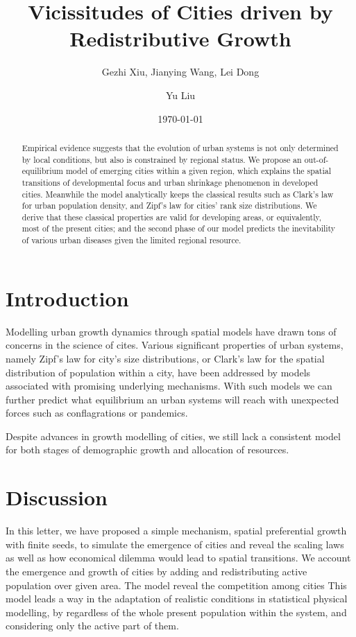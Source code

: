 \documentclass[reprint,unsortedaddress,amsmath,amssymb,aps,prl,showkeys]{revtex4-2}
\begin{document}
\title{Vicissitudes of Cities driven by Redistributive Growth}
\author{Gezhi Xiu, Jianying Wang, Lei Dong}
\author{Yu Liu}
\date{\today}

\begin{abstract}
    Empirical evidence suggests that the evolution of urban systems is not only determined by local conditions, but also is constrained by regional status. We propose an out-of-equilibrium model of emerging cities within a given region, which explains the spatial transitions of developmental focus and urban shrinkage phenomenon in developed cities. Meanwhile the model analytically keeps the classical results such as Clark's law for urban population density, and Zipf's law for cities' rank size distributions. We derive that these classical properties are valid for developing areas, or equivalently, most of the present cities; and the second phase of our model predicts the inevitability of various urban diseases given the limited regional resource. 
\end{abstract}
\maketitle
\section{Introduction}

Modelling urban growth dynamics through spatial models have drawn tons of concerns in the science of cites. Various significant properties of urban systems, namely Zipf's law for city's size distributions, or Clark's law for the spatial distribution of population within a city, have been addressed by models associated with promising underlying mechanisms. With such models we can further predict what equilibrium an urban systems will reach with unexpected forces such as conflagrations or pandemics. 

Despite advances in growth modelling of cities, we still lack a consistent model for both stages of demographic growth and allocation of resources.


\section{Discussion}


In this letter, we have proposed a simple mechanism, spatial preferential growth with finite seeds, to simulate the emergence of cities and reveal the scaling laws as well as how economical dilemma would lead to spatial transitions. We account the emergence and growth of cities by adding and redistributing active population over given area. The model reveal the competition among cities
This model leads a way in the adaptation of realistic conditions in statistical physical modelling, by regardless of the whole present population within the system, and considering only the active part of them. 
\end{document}
